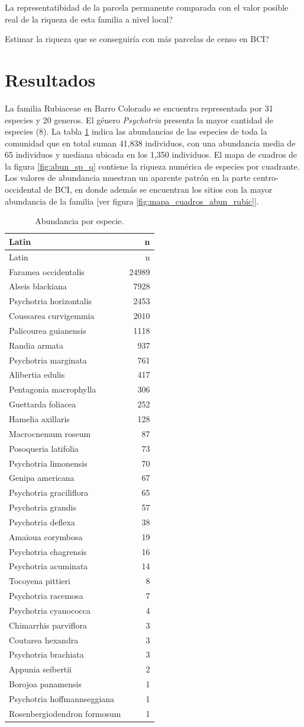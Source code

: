 \documentclass[11pt,]{article}
\begin{document}
La representatibidad de la parcela permanente comparada con el valor
posible real de la riqueza de esta familia a nivel local?

Estimar la riqueza que se conseguiría con más parcelas de censo en BCI?

\section{Resultados}\label{resultados}

La familia Rubiaceae en Barro Colorado se encuentra representada por 31
especies y 20 generos. El género \emph{Psychotria} presenta la mayor
cantidad de especies (8). La tabla \ref{tab:abun_sp} indica las
abundancias de las especies de toda la comunidad que en total suman
41,838 individuos, con una abundancia media de 65 individuos y mediana
ubicada en los 1,350 individuos. El mapa de cuadros de la figura
\ref{fig:abun_sp_q} contiene la riqueza numérica de especies por
cuadrante. Los valores de abundancia muestran un aparente patrón en la
parte centro-occidental de BCI, en donde además se encuentran los sitios
con la mayor abundancia de la familia {[}ver figura
\ref{fig:mapa_cuadros_abun_rubic}{]}.

\begin{longtable}[]{@{}lr@{}}
\caption{\label{tab:abun_sp}Abundancia por especie.}\tabularnewline
\toprule
Latin & n\tabularnewline
\midrule
\endfirsthead
\toprule
Latin & n\tabularnewline
\midrule
\endhead
Faramea occidentalis & 24989\tabularnewline
Alseis blackiana & 7928\tabularnewline
Psychotria horizontalis & 2453\tabularnewline
Coussarea curvigemmia & 2010\tabularnewline
Palicourea guianensis & 1118\tabularnewline
Randia armata & 937\tabularnewline
Psychotria marginata & 761\tabularnewline
Alibertia edulis & 417\tabularnewline
Pentagonia macrophylla & 306\tabularnewline
Guettarda foliacea & 252\tabularnewline
Hamelia axillaris & 128\tabularnewline
Macrocnemum roseum & 87\tabularnewline
Posoqueria latifolia & 73\tabularnewline
Psychotria limonensis & 70\tabularnewline
Genipa americana & 67\tabularnewline
Psychotria graciliflora & 65\tabularnewline
Psychotria grandis & 57\tabularnewline
Psychotria deflexa & 38\tabularnewline
Amaioua corymbosa & 19\tabularnewline
Psychotria chagrensis & 16\tabularnewline
Psychotria acuminata & 14\tabularnewline
Tocoyena pittieri & 8\tabularnewline
Psychotria racemosa & 7\tabularnewline
Psychotria cyanococca & 4\tabularnewline
Chimarrhis parviflora & 3\tabularnewline
Coutarea hexandra & 3\tabularnewline
Psychotria brachiata & 3\tabularnewline
Appunia seibertii & 2\tabularnewline
Borojoa panamensis & 1\tabularnewline
Psychotria hoffmannseggiana & 1\tabularnewline
Rosenbergiodendron formosum & 1\tabularnewline
\bottomrule
\end{longtable}
\end{document}

